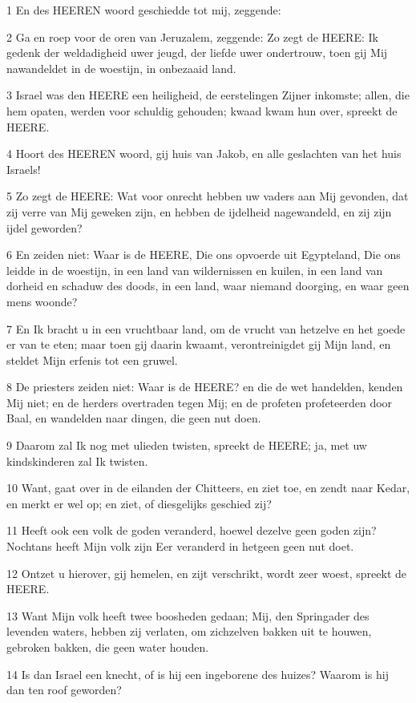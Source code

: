 \par 1 En des HEEREN woord geschiedde tot mij, zeggende:
\par 2 Ga en roep voor de oren van Jeruzalem, zeggende: Zo zegt de HEERE: Ik gedenk der weldadigheid uwer jeugd, der liefde uwer ondertrouw, toen gij Mij nawandeldet in de woestijn, in onbezaaid land.
\par 3 Israel was den HEERE een heiligheid, de eerstelingen Zijner inkomste; allen, die hem opaten, werden voor schuldig gehouden; kwaad kwam hun over, spreekt de HEERE.
\par 4 Hoort des HEEREN woord, gij huis van Jakob, en alle geslachten van het huis Israels!
\par 5 Zo zegt de HEERE: Wat voor onrecht hebben uw vaders aan Mij gevonden, dat zij verre van Mij geweken zijn, en hebben de ijdelheid nagewandeld, en zij zijn ijdel geworden?
\par 6 En zeiden niet: Waar is de HEERE, Die ons opvoerde uit Egypteland, Die ons leidde in de woestijn, in een land van wildernissen en kuilen, in een land van dorheid en schaduw des doods, in een land, waar niemand doorging, en waar geen mens woonde?
\par 7 En Ik bracht u in een vruchtbaar land, om de vrucht van hetzelve en het goede er van te eten; maar toen gij daarin kwaamt, verontreinigdet gij Mijn land, en steldet Mijn erfenis tot een gruwel.
\par 8 De priesters zeiden niet: Waar is de HEERE? en die de wet handelden, kenden Mij niet; en de herders overtraden tegen Mij; en de profeten profeteerden door Baal, en wandelden naar dingen, die geen nut doen.
\par 9 Daarom zal Ik nog met ulieden twisten, spreekt de HEERE; ja, met uw kindskinderen zal Ik twisten.
\par 10 Want, gaat over in de eilanden der Chitteers, en ziet toe, en zendt naar Kedar, en merkt er wel op; en ziet, of diesgelijks geschied zij?
\par 11 Heeft ook een volk de goden veranderd, hoewel dezelve geen goden zijn? Nochtans heeft Mijn volk zijn Eer veranderd in hetgeen geen nut doet.
\par 12 Ontzet u hierover, gij hemelen, en zijt verschrikt, wordt zeer woest, spreekt de HEERE.
\par 13 Want Mijn volk heeft twee boosheden gedaan; Mij, den Springader des levenden waters, hebben zij verlaten, om zichzelven bakken uit te houwen, gebroken bakken, die geen water houden.
\par 14 Is dan Israel een knecht, of is hij een ingeborene des huizes? Waarom is hij dan ten roof geworden?

